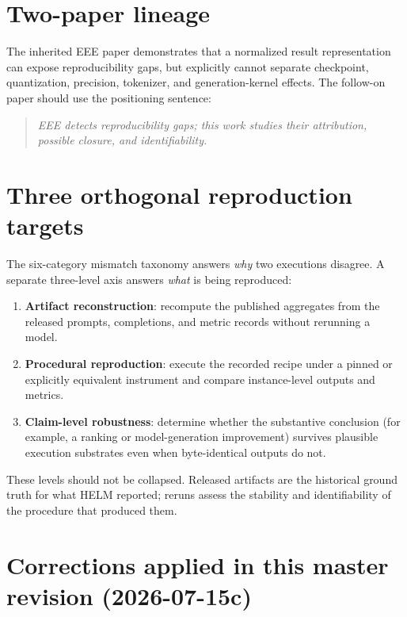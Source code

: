 \documentclass[11pt]{report}
\begin{document}
\section{Two-paper lineage}

The inherited EEE paper demonstrates that a normalized result representation can
expose reproducibility gaps, but explicitly cannot separate checkpoint,
quantization, precision, tokenizer, and generation-kernel effects. The follow-on
paper should use the positioning sentence:

\begin{quote}\itshape
EEE detects reproducibility gaps; this work studies their attribution, possible
closure, and identifiability.
\end{quote}

\section{Three orthogonal reproduction targets}
\label{sec:targets-3}

The six-category mismatch taxonomy answers \emph{why} two executions disagree. A
separate three-level axis answers \emph{what} is being reproduced:
\begin{enumerate}[nosep]
  \item \textbf{Artifact reconstruction}: recompute the published aggregates from the
        released prompts, completions, and metric records without rerunning a model.
  \item \textbf{Procedural reproduction}: execute the recorded recipe under a pinned
        or explicitly equivalent instrument and compare instance-level outputs and
        metrics.
  \item \textbf{Claim-level robustness}: determine whether the substantive conclusion
        (for example, a ranking or model-generation improvement) survives plausible
        execution substrates even when byte-identical outputs do not.
\end{enumerate}
These levels should not be collapsed. Released artifacts are the historical ground
truth for what HELM reported; reruns assess the stability and identifiability of the
procedure that produced them.

\section{Corrections applied in this master revision (2026-07-15c)}
\label{sec:corrections-applied}
\end{document}
